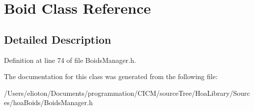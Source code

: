 \hypertarget{class_boid}{\section{Boid Class Reference}
\label{class_boid}
}


\subsection{Detailed Description}


Definition at line 74 of file Boids\-Manager.\-h.



The documentation for this class was generated from the following file\-:\begin{DoxyCompactItemize}
\item 
/\-Users/elioton/\-Documents/programmation/\-C\-I\-C\-M/source\-Tree/\-Hoa\-Library/\-Sources/hoa\-Boids/Boids\-Manager.\-h\end{DoxyCompactItemize}
